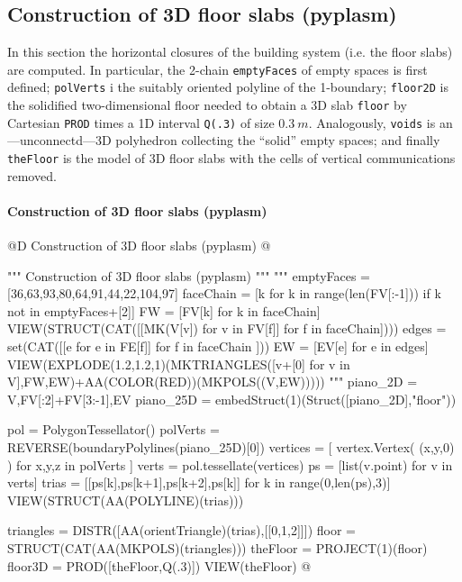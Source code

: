 \documentclass[11pt,oneside]{article}    %
\begin{document}
\subsection{Construction of 3D floor slabs (pyplasm)}

In this section the horizontal closures of the building system (i.e. the floor slabs) are computed.
In particular, the 2-chain \texttt{emptyFaces} of empty spaces is first defined; \texttt{polVerts} i the suitably oriented polyline of the 1-boundary; \texttt{floor2D} is the solidified two-dimensional floor needed to obtain a 3D slab \texttt{floor} by Cartesian \texttt{PROD} times a 1D interval \texttt{Q(.3)} of size $0.3\ m$. Analogously, \texttt{voids} is an---unconnectd---3D polyhedron collecting the ``solid'' empty spaces; and finally \texttt{theFloor} is the model of 3D floor slabs with the cells of vertical communications removed. 

\paragraph{Construction of 3D floor slabs (pyplasm)}
@D Construction of 3D floor slabs (pyplasm)
@{""" Construction of 3D floor slabs (pyplasm) """
"""
emptyFaces = [36,63,93,80,64,91,44,22,104,97]
faceChain = [k for k in range(len(FV[:-1])) if k not in emptyFaces+[2]]
FW = [FV[k] for k in faceChain]
VIEW(STRUCT(CAT([[MK(V[v]) for v in FV[f]] for f in faceChain])))
edges = set(CAT([[e for e in FE[f]]  for f in faceChain ]))
EW = [EV[e] for e in edges]
VIEW(EXPLODE(1.2,1.2,1)(MKTRIANGLES([v+[0] for v in V],FW,EW)+AA(COLOR(RED))(MKPOLS((V,EW)))))
"""
piano_2D = V,FV[:2]+FV[3:-1],EV
piano_25D = embedStruct(1)(Struct([piano_2D],"floor"))

pol = PolygonTessellator()
polVerts =  REVERSE(boundaryPolylines(piano_25D)[0])
vertices = [ vertex.Vertex( (x,y,0) ) for x,y,z in polVerts  ]
verts = pol.tessellate(vertices)
ps = [list(v.point) for v in verts]
trias = [[ps[k],ps[k+1],ps[k+2],ps[k]] for k in range(0,len(ps),3)]
VIEW(STRUCT(AA(POLYLINE)(trias)))

triangles = DISTR([AA(orientTriangle)(trias),[[0,1,2]]])
floor = STRUCT(CAT(AA(MKPOLS)(triangles)))
theFloor = PROJECT(1)(floor)
floor3D = PROD([theFloor,Q(.3)])
VIEW(theFloor)
@}
\end{document}
